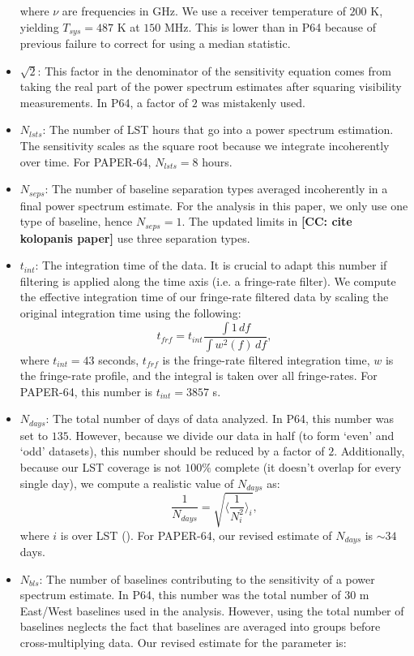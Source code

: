 \documentclass[preprint2,numberedappendix,tighten]{aastex6}  %
\newcommand{\cc}[1]{{\color{purple} \textbf{[CC: #1]}}}
\begin{document}
\begin{itemize}
where $\nu$ are frequencies in GHz. We use a receiver temperature of $200$ K, yielding $T_{sys} = 487$ K at $150$ MHz. This is lower than in P64 because of previous failure to correct for using a median statistic.
\item $\sqrt{2}$: This factor in the denominator of the sensitivity equation comes from taking the real part of the power spectrum estimates after squaring visibility measurements. In P64, a factor of $2$ was mistakenly used.
\item $N_{lsts}$: The number of LST hours that go into a power spectrum estimation. The sensitivity scales as the square root because we integrate incoherently over time. For PAPER-64, $N_{lsts} = 8$ hours.
\item $N_{seps}$: The number of baseline separation types averaged incoherently in a final power spectrum estimate. For the analysis in this paper, we only use one type of baseline, hence $N_{seps}=1$. The updated limits in \cc{cite kolopanis paper} use three separation types.
\item $t_{int}$: The integration time of the data. It is crucial to adapt this number if filtering is applied along the time axis (i.e. a fringe-rate filter). We compute the effective integration time of our fringe-rate filtered data by scaling the original integration time using the following:
\begin{equation}
t_{frf} = t_{int} \frac{\int1 \, df}{\int w^{2}(f) \,df},
\end{equation}
where $t_{int}=43$ seconds, $t_{frf}$ is the fringe-rate filtered integration time, $w$ is the fringe-rate profile, and the integral is taken over all fringe-rates. For PAPER-64, this number is $t_{int} = 3857$ s. 
\item $N_{days}$: The total number of days of data analyzed. In P64, this number was set to $135$. However, because we divide our data in half (to form `even' and `odd' datasets), this number should be reduced by a factor of $2$. Additionally, because our LST coverage is not $100\%$ complete (it doesn't overlap for every single day), we compute a realistic value of $N_{days}$ as:
\begin{equation}
 \frac{1}{N_{days}} = \sqrt{\Big\langle\frac{1}{N_{i}^{2}} \Big\rangle_{i}},
 \end{equation}
\noindent where $i$ is over LST (\citealt{jacobs_et_al2015}). For PAPER-64, our revised estimate of $N_{days}$ is $\sim34$ days.
\item $N_{bls}$: The number of baselines contributing to the sensitivity of a power spectrum estimate. In P64, this number was the total number of $30$ m East/West baselines used in the analysis. However, using the total number of baselines neglects the fact that baselines are averaged into groups before cross-multiplying data. Our revised estimate for the parameter is:

\end{itemize}
\end{document}
